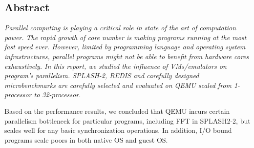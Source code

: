 \thispagestyle{empty}
\subsection*{\centering Abstract}
{\em
Parallel computing is playing a critical role in state of the art of 
computation power. The rapid growth of core number is making programs 
running at the most fast speed ever. However, limited by programming 
language and operating system infrastructures, parallel programs might 
not be able to benefit from hardware cores exhaustively. In this report, 
we studied the influence of VMs/emulators on program's parallelism. 
SPLASH-2, REDIS and carefully designed microbenchmarks are carefully selected
and evaluated on QEMU scaled from 1-processor to 32-processor.

Based on the performance results, we concluded that QEMU incurs
certain parallelism bottleneck for particular programs, including FFT in 
SPLASH2-2, but scales well for any basic synchronization operations.
In addition, I/O bound programs scale poors in both native OS and guest OS.

}

